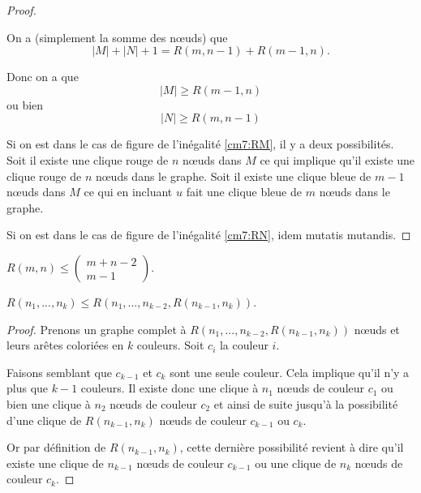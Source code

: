 \begin{mytheo} 
\begin{proof}
\begin{figure} [!h]
\end{figure}

 On a (simplement la somme des nœuds) que
 $$|M|+|N|+1 = R(m,n-1) + R(m-1,n).$$

 Donc on a que
 \begin{equation} \label{cm7:RM}
   |M| \geq R(m-1,n)
 \end{equation}
 ou bien
 \begin{equation} \label{cm7:RN}
   |N| \geq R(m,n-1)
 \end{equation}

Si on est dans le cas de figure de l'inégalité \ref{cm7:RM}, il y a deux possibilités.
Soit il existe une clique rouge de $n$ nœuds dans $M$ ce qui implique qu'il existe une clique rouge de $n$ nœuds dans le graphe.
Soit il existe une clique bleue de $m-1$ nœuds dans $M$ ce qui en incluant $u$ fait une clique bleue de $m$ nœuds dans le graphe.

Si on est dans le cas de figure de l'inégalité \ref{cm7:RN}, idem mutatis mutandis.
  \end{proof}
\end{mytheo}

\begin{mycorr}
  $R(m,n) \leq \begin{pmatrix}
m+n-2\\
m-1
\end{pmatrix}$.
\end{mycorr}

\begin{mytheo}
$R(n_1,...,n_k) \leq R \left( n_1,...,n_{k-2},R(n_{k-1},n_k) \right)$.

\begin{proof}
  Prenons un graphe complet à $R(n_1, ..., n_{k-2}, R(n_{k-1}, n_k))$ nœuds et leurs arêtes coloriées en $k$ couleurs. Soit $c_i $ la couleur $i$.

  Faisons semblant que $c_{k-1}$ et $c_{k}$ sont une seule couleur.
  Cela implique qu'il n'y a plus que $k-1$ couleurs.
  Il existe donc une clique à $n_1$ nœuds de couleur $c_1$ ou bien une clique à $n_2$ nœuds de couleur $c_2$ et ainsi de suite jusqu'à la possibilité d'une clique de $R(n_{k-1}, n_k)$ nœuds de couleur $c_{k-1}$ ou $c_{k}$.

  Or par définition de $R(n_{k-1}, n_k)$, cette dernière possibilité revient à dire qu'il existe une clique de $n_{k-1}$ nœuds de couleur $c_{k-1}$ ou une clique de $n_{k}$ nœuds de couleur $c_{k}$.
\end{proof}
\end{mytheo}

